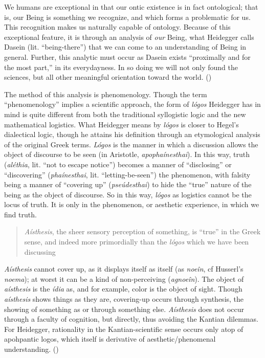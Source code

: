 \documentclass[leqno, 12pt]{turabian-researchpaper}
\begin{document}
	We humans are exceptional in that our ontic existence is in fact ontological; that
	is, our Being is something we recognize, and which forms a problematic for us.
	This recognition makes us naturally capable of ontology. Because of this exceptional
	feature, it is through an analysis of \emph{our} Being, what Heidegger calls
	Dasein (lit. \enquote{being-there}) that we can come to an understanding of
	Being in general. Further, this analytic must occur as Dasein exists \enquote{proximally and for the most part,}
	in its everydayness. In so doing we will not only found the sciences, but all other
	meaningful orientation toward the world. ()

	The method of this analysis is phenomenology. Though the term \enquote{phenomenology}
	implies a scientific approach, the form of \textit{l\'ogos} Heidegger has in
	mind is quite different from both the traditional syllogistic logic and the
	new mathematical logistics. What Heidegger means by \textit{l\'ogos} is closer
	to Hegel's dialectical logic, though he attains his definition through an etymological
	analysis of the original Greek terms. \textit{L\'ogos} is the manner in which a
	discussion allows the object of discourse to be seen (in Aristotle, \textit{apopha\'inesthai}).
	In this way, truth (\textit{al\'ethia}, lit. \enquote{not to escape notice}) becomes
	a manner of \enquote{disclosing} or \enquote{discovering} (\textit{pha\'inesthai},
	lit. \enquote{letting-be-seen}) the phenomenon, with falsity being a manner of
	\enquote{covering up} (\textit{pse\'udesthai}) to hide the \enquote{true} nature
	of the being as the object of discourse. So in this way, \textit{l\'ogos} as
	logistics cannot be the locus of truth. It is only in the phenomenon, or
	aesthetic experience, in which we find truth. \blockquote[{}]
	{\textit{A\'isthesis}, %
	the sheer sensory perception of something, is \enquote{true} in the Greek sense, and indeed %
	more primordially than the \textit{l\'ogos} which we have been discussing}.
	\textit{A\'isthesis} cannot cover up, as it displays itself as itself (as \textit{noe\^in},
	cf Husserl's \textit{noema}); at worst it can be a kind of non-perceiving (\textit{agnoe\^in}).
	The object of \textit{a\'isthesis} is the \textit{\'idia} as, and for example,
	color is the object of sight. Though \textit{a\'isthesis} shows things as they
	are, covering-up occurs through synthesis, the showing of something as or
	through something else. \textit{A\'isthesis} does not occur through a faculty
	of cognition, but directly, thus avoiding the Kantian dilemmas. For Heidegger,
	rationality in the Kantian-scientific sense occurs only atop of apohpantic
	logos, which itself is derivative of aesthetic/phenomenal understanding. ()
\end{document}

